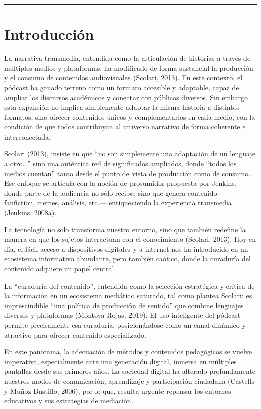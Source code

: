 \documentclass[
]{interact}
\begin{document}
\begin{center}\rule{0.5\linewidth}{0.5pt}\end{center}

\section{Introducción}\label{introducciuxf3n}

La narrativa transmedia, entendida como la articulación de historias a
través de múltiples medios y plataformas, ha modificado de forma
sustancial la producción y el consumo de contenidos audiovisuales
(Scolari, 2013). En este contexto, el pódcast ha ganado terreno como un
formato accesible y adaptable, capaz de ampliar los discursos académicos
y conectar con públicos diversos. Sin embargo esta expansión no implica
simplemente adaptar la misma historia a distintos formatos, sino ofrecer
contenidos únicos y complementarios en cada medio, con la condición de
que todos contribuyan al universo narrativo de forma coherente e
interconectada.

Scolari (2013), insiste en que ``no son simplemente una adaptación de un
lenguaje a otro\ldots{}'' sino una auténtica red de significados
ampliados, donde ``todos los medios cuentan'' tanto desde el punto de
vista de producción como de consumo. Ese enfoque se articula con la
noción de prosumidor propuesta por Jenkins, donde parte de la audiencia
no sólo recibe, sino que genera contenido ---fanfiction, memes,
análisis, etc.--- enriqueciendo la experiencia transmedia (Jenkins,
2008a).

La tecnología no solo transforma nuestro entorno, sino que también
redefine la manera en que los sujetos interactúan con el conocimiento
(Scolari, 2013). Hoy en día, el fácil acceso a dispositivos digitales y
a internet nos ha introducido en un ecosistema informativo abundante,
pero también caótico, donde la curaduría del contenido adquiere un papel
central.

La ``curaduría del contenido'', entendida como la selección estratégica
y crítica de la información en un ecosistema mediático saturado, tal
como plantea Scolari: es imprescindible ``una política de producción de
sentido'' que combine lenguajes diversos y plataformas (Montoya Rojas,
2019). El uso inteligente del pódcast permite precisamente esa
curaduría, posicionándose como un canal dinámico y atractivo para
ofrecer contenido especializado.

En este panorama, la adecuación de métodos y contenidos pedagógicos se
vuelve imperativa, especialmente ante una generación digital, inmersa en
múltiples pantallas desde sus primeros años. La sociedad digital ha
alterado profundamente nuestros modos de comunicación, aprendizaje y
participación ciudadana (Castells y Muñoz Bustillo, 2006), por lo que,
resulta urgente repensar los entornos educativos y sus estrategias de
mediación.
\end{document}
